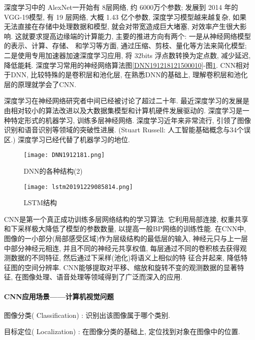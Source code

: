 深度学习中的 AlexNet一开始有 8层网络, 约 6000万个参数; 发展到 2014 年的 VGG-19模型, 有 19 层网络, 大概 1.43 亿个参数, 深度学习模型越来越复杂, 如果无法直接在存储中处理数据和模型, 就会对带宽造成巨大堵塞, 对效率产生很大影响.
这就要求提高边缘端的计算能力, 主要的推进方向有两个:  一是从神经网络模型的表示、计算、存储、 和学习等方面, 通过压缩、剪枝、量化等方法来简化模型;  二是使用专用加速器加速深度学习应用, 将 32bits 浮点数转换为定点数, 减少延迟, 降低能耗.
深度学习常用的神经网络算法图\ref{DNN191218121500010}-图\ref{DNN191218121500011}. CNN相对于DNN, 比较特殊的是卷积层和池化层, 在熟悉DNN的基础上, 理解卷积层和池化层的原理就学会了CNN.

深度学习在神经网络研究者中间已经被讨论了超过二十年. 最近深度学习的发展是由相对较小的算法改进以及大数据集模型和计算机硬件发展驱动的.
深度学习是一种特定形式的机器学习, 训练多层神经网络. 深度学习近年来非常流行, 引领了图像识别和语音识别等领域的突破性进展. (Stuart Russell: 人工智能基础概念与34个误区.)
深度学习已经代替了机器学习的地位.
\begin{figure}[H]
\centering
\texttt{[image: DNN1912181.png]}
\caption{DNN的各种结构(2)}
\label{DNN191218121500011}
\end{figure}
\begin{figure}[H]
\centering
\texttt{[image: lstm20191229085814.png]}
\caption{LSTM结构}
\label{lstm20191229085814}
\end{figure}
CNN是第一个真正成功训练多层网络结构的学习算法. 它利用局部连接, 权重共享和下采样极大降低了模型的参数数量, 以提高一般BP网络的训练性能.
在CNN中, 图像的一小部分(局部感受区域)作为层级结构的最低层的输入, 神经元只与上一层中部分神经元相连, 并且不同的神经元共享权值, 每层通过不同的卷积核去获得观测数据的不同特征, 然后通过下采样(池化)将语义上相似的特
征合并起来, 降低特征图的空间分辨率.  CNN能够提取对平移、缩放和旋转不变的观测数据的显著特征, 在图像处理、语音处理等领域得到了广泛而深入的应用.
\paragraph{CNN应用场景——计算机视觉问题}

 图像分类( Classification) : 识别出该图像属于哪个类别.

 目标定位( Localization) :  在图像分类的基础上,  定位找到对象在图像中的位置.

